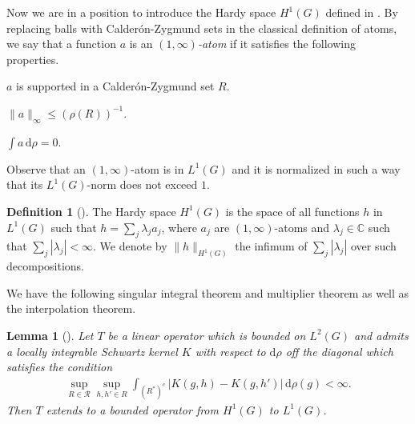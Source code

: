 \documentclass[a4paper,12pt]{amsart}
\numberwithin{equation}{section}
\newtheorem{lemma}[theorem]{Lemma}
\theoremstyle{definition}
\newtheorem{definition}[theorem]{Definition}
\theoremstyle{remark}
\numberwithin{theorem}{section}
\renewcommand{\d}{\mathrm{d}}
\begin{document}
Now we are in a position to introduce the Hardy space $H^1(G)$ defined in \cite{Va}. By replacing balls with Calder\'{o}n-Zygmund sets in the classical definition of atoms, we say that a function $a$ is an \emph{$(1,\infty)$-atom} if it satisfies the following properties.
\begin{asparaenum}
\item $a$ is supported in a Calder\'{o}n-Zygmund set $R$.
\item $\|a\|_\infty\leq(\rho(R))^{-1}$.
\item $\int a\,\d\rho=0$.
\end{asparaenum}
Observe that an $(1,\infty)$-atom is in $L^1(G)$ and it is normalized in such a way that its $L^1(G)$-norm does not exceed $1$.
\begin{definition}[{\cite[Definition 2.2]{Va}}]\label{def2.4}
The Hardy space $H^1(G)$ is the space of all functions $h$ in $L^1(G)$ such that $h=\sum_j\lambda_ja_j$, where $a_j$ are $(1,\infty)$-atoms and $\lambda_j\in \mathbb{C}$ such that $\sum_j|\lambda_j|<\infty$. We denote by $\|h\|_{H^1(G)}$ the infimum of $\sum_j|\lambda_j|$ over such decompositions.
\end{definition}
We have the following singular integral theorem and multiplier theorem as well as the interpolation theorem.
\begin{lemma}[{\cite[Theorem 4.1]{Va}}]\label{lem2.5}
Let $T$ be a linear operator which is bounded on $L^2(G)$ and admits a locally integrable Schwartz kernel $K$ with respect to $\d\rho$ off the diagonal which satisfies the condition
\begin{align*}
\sup_{R\in\mathscr{R}}\sup_{h,h'\in R}\int_{(R^*)^c}|K(g,h)-K(g,h')|\,\d \rho(g)<\infty.
\end{align*}
Then $T$ extends to a bounded operator from $H^1(G)$ to $L^1(G)$.
\end{lemma}
\end{document}

